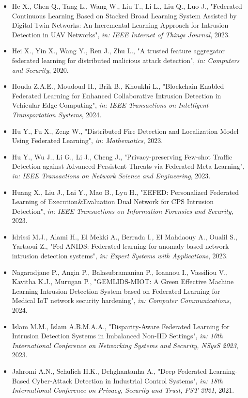 \begin{itemize}
  \item He X., Chen Q., Tang L., Wang W., Liu T., Li L., Liu Q., Luo J., "Federated Continuous Learning Based on Stacked Broad Learning System Assisted by Digital Twin Networks: An Incremental Learning Approach for Intrusion Detection in UAV Networks", \textit{in: IEEE Internet of Things Journal}, 2023.
  \item Hei X., Yin X., Wang Y., Ren J., Zhu L., "A trusted feature aggregator federated learning for distributed malicious attack detection", \textit{in: Computers and Security}, 2020.
  \item Houda Z.A.E., Moudoud H., Brik B., Khoukhi L., "Blockchain-Enabled Federated Learning for Enhanced Collaborative Intrusion Detection in Vehicular Edge Computing", \textit{in: IEEE Transactions on Intelligent Transportation Systems}, 2024.
  \item Hu Y., Fu X., Zeng W., "Distributed Fire Detection and Localization Model Using Federated Learning", \textit{in: Mathematics}, 2023.
  \item Hu Y., Wu J., Li G., Li J., Cheng J., "Privacy-preserving Few-shot Traffic Detection against Advanced Persistent Threats via Federated Meta Learning", \textit{in: IEEE Transactions on Network Science and Engineering}, 2023.
  \item Huang X., Liu J., Lai Y., Mao B., Lyu H., "EEFED: Personalized Federated Learning of Execution\&Evaluation Dual Network for CPS Intrusion Detection", \textit{in: IEEE Transactions on Information Forensics and Security}, 2023.
  \item Idrissi M.J., Alami H., El Mekki A., Berrada I., El Mahdaouy A., Oualil S., Yartaoui Z., "Fed-ANIDS: Federated learning for anomaly-based network intrusion detection systems", \textit{in: Expert Systems with Applications}, 2023.
  \item Nagaradjane P., Angin P., Balasubramanian P., Ioannou I., Vassiliou V., Kavitha K.J., Murugan P., "GEMLIDS-MIOT: A Green Effective Machine Learning Intrusion Detection System based on Federated Learning for Medical IoT network security hardening", \textit{in: Computer Communications}, 2024.
  \item Islam M.M., Islam A.B.M.A.A., "Disparity-Aware Federated Learning for Intrusion Detection Systems in Imbalanced Non-IID Settings", \textit{in: 10th International Conference on Networking Systems and Security, NSysS 2023}, 2023.
  \item Jahromi A.N., Schulich H.K., Dehghantanha A., "Deep Federated Learning-Based Cyber-Attack Detection in Industrial Control Systems", \textit{in: 18th International Conference on Privacy, Security and Trust, PST 2021}, 2021.

\end{itemize}
